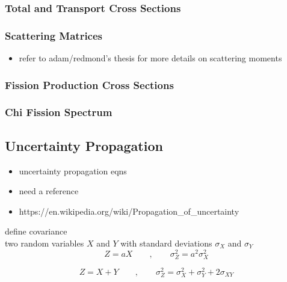 \subsubsection{Total and Transport Cross Sections}
\label{subsubsec:chap3-tot-xs}

\subsubsection{Scattering Matrices}
\label{subsubsec:chap3-scatt-mat}

\begin{itemize}[noitemsep]
  \item refer to adam/redmond's thesis for more details on scattering moments
\end{itemize}

\subsubsection{Fission Production Cross Sections}
\label{subsubsec:chap3-fiss-prod}

\subsubsection{Chi Fission Spectrum}
\label{subsubsec:chap3-chi}


\subsection{Uncertainty Propagation}
\label{subsec:chap3-uncertainty-prop}

\begin{itemize}[noitemsep]
  \item uncertainty propagation eqns
  \item need a reference
  \item https://en.wikipedia.org/wiki/Propagation_of_uncertainty
\end{itemize}

define covariance\\
two random variables $X$ and $Y$ with standard deviations $\sigma_{X}$ and $\sigma_{Y}$\\

\begin{equation}
Z = aX \qquad,\qquad \sigma_{Z}^{2} = a^{2}\sigma_{X}^{2}
\end{equation}

\begin{equation}
Z = X + Y \qquad,\qquad \sigma_{Z}^{2} = \sigma_{X}^{2} + \sigma_{Y}^{2} + 2\sigma_{XY}
\end{equation}

